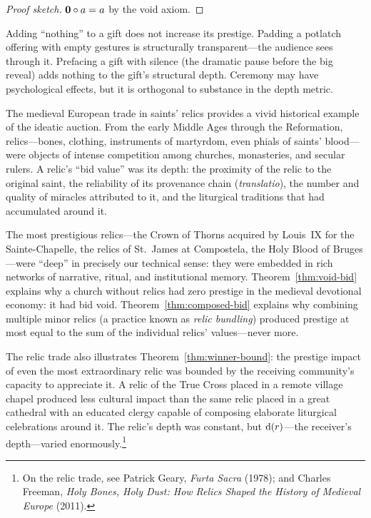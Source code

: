 \begin{proof}[Proof sketch]
$\mathbf{0} \circ a = a$ by the void axiom.
\end{proof}

Adding ``nothing'' to a gift does not increase its prestige.  Padding a
potlatch offering with empty gestures is structurally transparent---the
audience sees through it.  Prefacing a gift with silence (the dramatic pause
before the big reveal) adds nothing to the gift's structural depth.
Ceremony may have psychological effects, but it is orthogonal to substance
in the depth metric.

\begin{example}
\label{ex:relics}
The medieval European trade in saints' relics provides a vivid historical
example of the ideatic auction.  From the early Middle Ages through the
Reformation, relics---bones, clothing, instruments of martyrdom, even
phials of saints' blood---were objects of intense competition among
churches, monasteries, and secular rulers.  A relic's ``bid value'' was
its depth: the proximity of the relic to the original saint, the
reliability of its provenance chain (\textit{translatio}), the number
and quality of miracles attributed to it, and the liturgical traditions
that had accumulated around it.

The most prestigious relics---the Crown of Thorns acquired by Louis~IX
for the Sainte-Chapelle, the relics of St.~James at Compostela, the
Holy Blood of Bruges---were ``deep'' in precisely our technical sense:
they were embedded in rich networks of narrative, ritual, and institutional
memory.  Theorem~\ref{thm:void-bid} explains why a church without relics
had zero prestige in the medieval devotional economy: it had bid void.
Theorem~\ref{thm:composed-bid} explains why combining multiple minor
relics (a practice known as \textit{relic bundling}) produced prestige at
most equal to the sum of the individual relics' values---never more.

The relic trade also illustrates Theorem~\ref{thm:winner-bound}: the
prestige impact of even the most extraordinary relic was bounded by the
receiving community's capacity to appreciate it.  A relic of the True
Cross placed in a remote village chapel produced less cultural impact
than the same relic placed in a great cathedral with an educated clergy
capable of composing elaborate liturgical celebrations around it.  The
relic's depth was constant, but $\operatorname{d}(r)$---the receiver's depth---varied
enormously.\footnote{On the relic trade, see Patrick Geary, \textit{Furta
Sacra} (1978); and Charles Freeman, \textit{Holy Bones, Holy Dust: How
Relics Shaped the History of Medieval Europe} (2011).}
\end{example}

